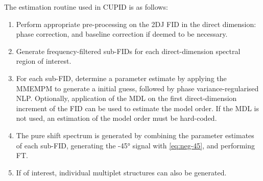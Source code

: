 The estimation routine used in \ac{CUPID} is as follows:
\begin{enumerate}
    \item Perform appropriate pre-processing on the \ac{2DJ} \ac{FID} in the
        direct dimension: phase correction, and baseline correction if deemed
        to be necessary.
    \item Generate frequency-filtered sub-\acp{FID} for each direct-dimension
        spectral region of interest.
    \item For each sub-\ac{FID}, determine a parameter estimate by applying
        the \ac{MMEMPM} to generate a initial guess, followed by phase
        variance-regularised \ac{NLP}. Optionally, application of the \ac{MDL}
        on the first direct-dimension increment of the \ac{FID} can be used to
        estimate the model order. If the \ac{MDL} is not used, an estimation of
        the model order must be hard-coded.
    \item The pure shift spectrum is generated by combining the parameter
        estimates of each sub-\ac{FID}, generating the \ang{-45} signal with
        \eqref{eq:neg-45}, and performing \ac{FT}.
    \item If of interest, individual multiplet structures can also be generated.
\end{enumerate}


